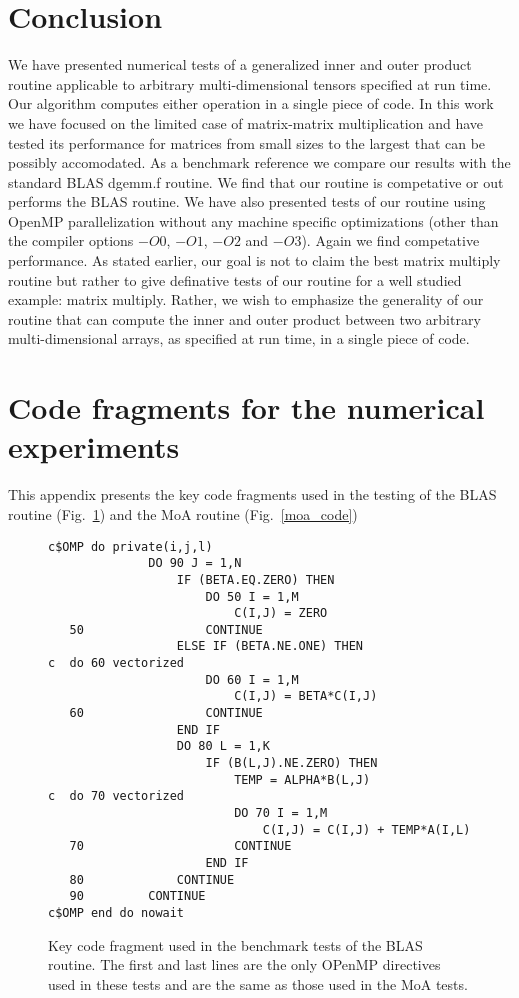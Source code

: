 \documentclass[aps,prl,twocolumn,groupedaddress,floatfix]{revtex4}
\begin{document}
\section{Conclusion}

We have presented numerical tests of a generalized inner and outer 
product routine applicable to arbitrary multi-dimensional tensors specified
at run time. Our algorithm computes either operation in a single piece of 
code.  In this work we have focused on the limited case of matrix-matrix
multiplication and have tested its performance for matrices from small sizes
to the largest that can be possibly accomodated.  As a benchmark reference
we compare our results with the standard BLAS dgemm.f routine.  We find 
that our routine is competative or out performs the BLAS routine.  We have
also presented tests of our routine using OpenMP parallelization without
any machine specific optimizations (other than the compiler options $-O0$,
$-O1$, $-O2$ and $-O3$).  Again we find competative performance.  As stated
earlier, our goal is not to claim the best matrix multiply routine but rather
to give definative tests of our routine for a well studied example: matrix
multiply.  Rather, we wish to emphasize the generality of our routine that
can compute the inner and outer product between two arbitrary multi-dimensional
arrays, as specified at run time, in a single piece of code.










\appendix
\section{Code fragments for the numerical experiments}

This appendix presents the key code fragments used in the testing of 
the BLAS routine (Fig.~\ref{blas_code}) and the MoA routine 
(Fig.~\ref{moa_code}) 

\begin{figure}
\begin{verbatim}
c$OMP do private(i,j,l)
              DO 90 J = 1,N
                  IF (BETA.EQ.ZERO) THEN
                      DO 50 I = 1,M
                          C(I,J) = ZERO
   50                 CONTINUE
                  ELSE IF (BETA.NE.ONE) THEN
c  do 60 vectorized
                      DO 60 I = 1,M
                          C(I,J) = BETA*C(I,J)
   60                 CONTINUE
                  END IF
                  DO 80 L = 1,K
                      IF (B(L,J).NE.ZERO) THEN
                          TEMP = ALPHA*B(L,J)
c  do 70 vectorized
                          DO 70 I = 1,M
                              C(I,J) = C(I,J) + TEMP*A(I,L)
   70                     CONTINUE
                      END IF
   80             CONTINUE
   90         CONTINUE
c$OMP end do nowait

\end{verbatim}
\caption{
\label{blas_code}
Key code fragment used in the benchmark tests of the BLAS routine.  The
first and last lines are the only OPenMP directives used in these tests
and are the same as those used in the MoA tests.
}
\end{figure}
\end{document}
